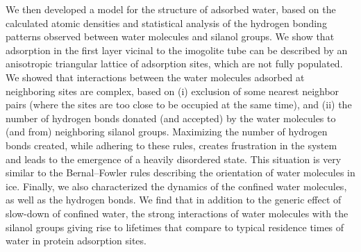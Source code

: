 \documentclass[thesis]{subfiles}
\begin{document}
We then developed a model for the structure of adsorbed water, based on the
calculated atomic densities and statistical analysis of the hydrogen bonding
patterns observed between water molecules and silanol groups. We show that
adsorption in the first layer vicinal to the imogolite tube can be described by
an anisotropic triangular lattice of adsorption sites, which are not fully
populated. We showed that interactions between the water molecules adsorbed at
neighboring sites are complex, based on (i) exclusion of some nearest neighbor
pairs (where the sites are too close to be occupied at the same time), and (ii)
the number of hydrogen bonds donated (and accepted) by the water molecules to
(and from) neighboring silanol groups. Maximizing the number of hydrogen bonds
created, while adhering to these rules, creates frustration in the system and
leads to the emergence of a heavily disordered state. This situation is very
similar to the Bernal--Fowler rules describing the orientation of water
molecules in ice\cite{Bernal1933}. Finally, we also characterized the dynamics
of the confined water molecules, as well as the hydrogen bonds. We find that in
addition to the generic effect of slow-down of confined water, the strong
interactions of water molecules with the silanol groups giving rise to lifetimes
that compare to typical residence times of water in protein adsorption sites.

\OnlyInSubfile{\printglobalbibliography}
\end{document}

